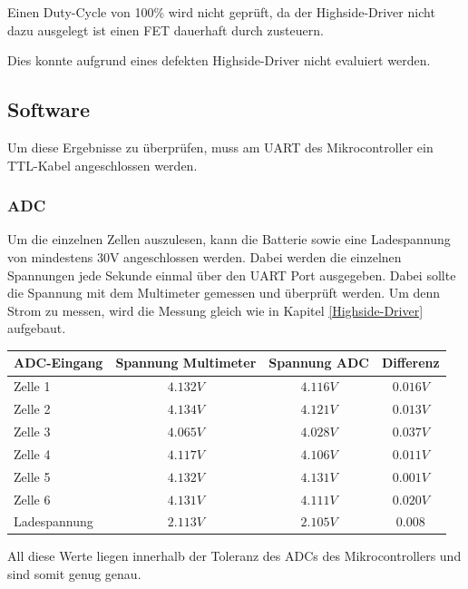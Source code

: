 Einen Duty-Cycle von 100\% wird nicht geprüft, da der Highside-Driver nicht dazu ausgelegt ist einen FET dauerhaft durch zusteuern.

Dies konnte aufgrund eines defekten Highside-Driver nicht evaluiert werden. 

\subsection{Software}
Um diese Ergebnisse zu überprüfen, muss am UART des Mikrocontroller ein TTL-Kabel angeschlossen werden.

\subsubsection*{ADC}
Um die einzelnen Zellen auszulesen, kann die Batterie sowie eine Ladespannung von mindestens 30V angeschlossen werden. Dabei werden die einzelnen Spannungen jede Sekunde einmal über den UART Port ausgegeben. Dabei sollte die Spannung mit dem Multimeter gemessen und überprüft werden. Um denn Strom zu messen, wird die Messung gleich wie in Kapitel \ref{Highside-Driver} aufgebaut. 

\begin{center}
	\begin{tabular}{l|c|c|c}
		ADC-Eingang & Spannung Multimeter & Spannung ADC & Differenz \\ \hline
		Zelle 1 & $4.132V$ & $4.116V$ & $0.016V$ \\ \hline
		Zelle 2 & $4.134V$ & $4.121V$ & $0.013V$ \\ \hline
		Zelle 3 & $4.065V$ & $4.028V$ & $0.037V$ \\ \hline
		Zelle 4 & $4.117V$ & $4.106V$ & $0.011V$ \\ \hline
		Zelle 5 & $4.132V$ & $4.131V$ & $0.001V$ \\ \hline
		Zelle 6 & $4.131V$ & $4.111V$ & $0.020V$ \\ \hline
		Ladespannung & $2.113V$ & $2.105V$ & $0.008$ \\ \hline
	\end{tabular} 
	\label{tab:Spannungengemessen}
\end{center}

All diese Werte liegen innerhalb der Toleranz des ADCs des Mikrocontrollers und sind somit genug genau.

